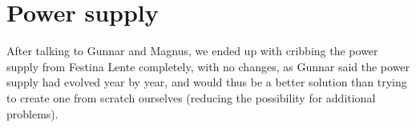 \section {Power supply}

After talking to Gunnar and Magnus, we ended up with cribbing the power supply from
Festina Lente completely, with no changes, as Gunnar said the power supply had
evolved year by year, and would thus be a better solution than trying to
create one from scratch ourselves (reducing the possibility for additional
problems).
